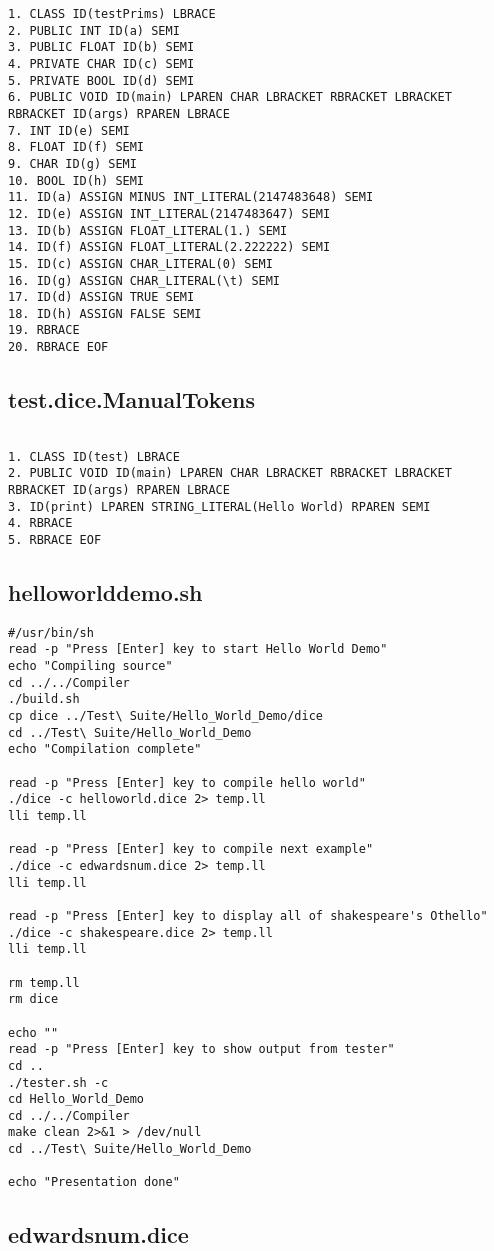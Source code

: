 \begin{verbatim}
1. CLASS ID(testPrims) LBRACE
2. PUBLIC INT ID(a) SEMI
3. PUBLIC FLOAT ID(b) SEMI
4. PRIVATE CHAR ID(c) SEMI
5. PRIVATE BOOL ID(d) SEMI
6. PUBLIC VOID ID(main) LPAREN CHAR LBRACKET RBRACKET LBRACKET RBRACKET ID(args) RPAREN LBRACE
7. INT ID(e) SEMI
8. FLOAT ID(f) SEMI
9. CHAR ID(g) SEMI
10. BOOL ID(h) SEMI
11. ID(a) ASSIGN MINUS INT_LITERAL(2147483648) SEMI
12. ID(e) ASSIGN INT_LITERAL(2147483647) SEMI
13. ID(b) ASSIGN FLOAT_LITERAL(1.) SEMI
14. ID(f) ASSIGN FLOAT_LITERAL(2.222222) SEMI
15. ID(c) ASSIGN CHAR_LITERAL(0) SEMI
16. ID(g) ASSIGN CHAR_LITERAL(\t) SEMI
17. ID(d) ASSIGN TRUE SEMI
18. ID(h) ASSIGN FALSE SEMI
19. RBRACE
20. RBRACE EOF

\end{verbatim}\pagebreak\subsection{test.dice.ManualTokens}
\begin{verbatim}

1. CLASS ID(test) LBRACE
2. PUBLIC VOID ID(main) LPAREN CHAR LBRACKET RBRACKET LBRACKET RBRACKET ID(args) RPAREN LBRACE
3. ID(print) LPAREN STRING_LITERAL(Hello World) RPAREN SEMI
4. RBRACE
5. RBRACE EOF

\end{verbatim}\pagebreak\subsection{helloworlddemo.sh}
\begin{verbatim}
#/usr/bin/sh
read -p "Press [Enter] key to start Hello World Demo"
echo "Compiling source"
cd ../../Compiler
./build.sh
cp dice ../Test\ Suite/Hello_World_Demo/dice
cd ../Test\ Suite/Hello_World_Demo
echo "Compilation complete"

read -p "Press [Enter] key to compile hello world"
./dice -c helloworld.dice 2> temp.ll
lli temp.ll

read -p "Press [Enter] key to compile next example"
./dice -c edwardsnum.dice 2> temp.ll
lli temp.ll

read -p "Press [Enter] key to display all of shakespeare's Othello"
./dice -c shakespeare.dice 2> temp.ll
lli temp.ll

rm temp.ll
rm dice

echo ""
read -p "Press [Enter] key to show output from tester"
cd ..
./tester.sh -c
cd Hello_World_Demo
cd ../../Compiler
make clean 2>&1 > /dev/null
cd ../Test\ Suite/Hello_World_Demo

echo "Presentation done"
\end{verbatim}\pagebreak\subsection{edwardsnum.dice}
